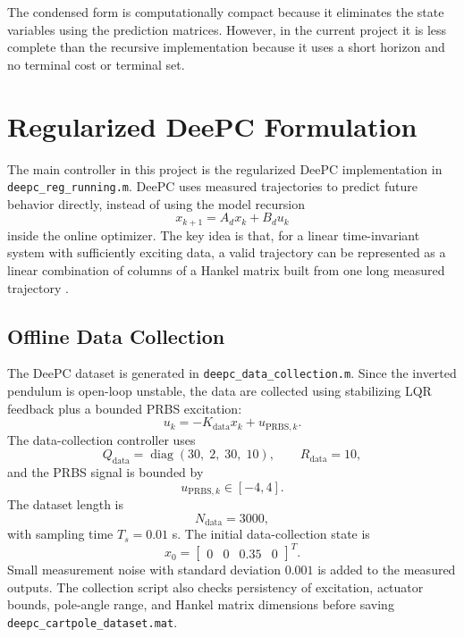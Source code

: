 \documentclass[conference]{IEEEtran}
\begin{document}
The condensed form is computationally compact because it eliminates the state variables using the prediction matrices. However, in the current project it is less complete than the recursive implementation because it uses a short horizon and no terminal cost or terminal set.

\section{Regularized DeePC Formulation}
The main controller in this project is the regularized DeePC implementation in \texttt{deepc\_reg\_running.m}. DeePC uses measured trajectories to predict future behavior directly, instead of using the model recursion
\[
x_{k+1}=A_d x_k+B_d u_k
\]
inside the online optimizer. The key idea is that, for a linear time-invariant system with sufficiently exciting data, a valid trajectory can be represented as a linear combination of columns of a Hankel matrix built from one long measured trajectory \cite{coulson2019deepc}.

\subsection{Offline Data Collection}
The DeePC dataset is generated in \texttt{deepc\_data\_collection.m}. Since the inverted pendulum is open-loop unstable, the data are collected using stabilizing LQR feedback plus a bounded PRBS excitation:
\[
u_k = -K_{\mathrm{data}}x_k + u_{\mathrm{PRBS},k}.
\]
The data-collection controller uses
\[
Q_{\mathrm{data}}=\operatorname{diag}(30,\;2,\;30,\;10),
\qquad R_{\mathrm{data}}=10,
\]
and the PRBS signal is bounded by
\[
u_{\mathrm{PRBS},k}\in[-4,4].
\]
The dataset length is
\[
N_{\mathrm{data}}=3000,
\]
with sampling time $T_s=0.01$ s. The initial data-collection state is
\[
x_0 =
\begin{bmatrix}
0 & 0 & 0.35 & 0
\end{bmatrix}^{T}.
\]
Small measurement noise with standard deviation $0.001$ is added to the measured outputs. The collection script also checks persistency of excitation, actuator bounds, pole-angle range, and Hankel matrix dimensions before saving \texttt{deepc\_cartpole\_dataset.mat}.
\end{document}
